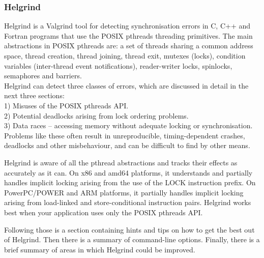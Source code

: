 \subsubsection{Helgrind}
Helgrind is a Valgrind tool for detecting synchronisation errors in C, C++ and Fortran programs that use the POSIX pthreads threading primitives.
The main abstractions in POSIX pthreads are: a set of threads sharing a common address space, thread creation, thread joining, thread exit, mutexes (locks), condition variables (inter-thread event notifications), reader-writer locks, spinlocks, semaphores and barriers.\\
Helgrind can detect three classes of errors, which are discussed in detail in the next three sections:\\
1) Misuses of the POSIX pthreads API.\\
2) Potential deadlocks arising from lock ordering problems.\\
3) Data races -- accessing memory without adequate locking or synchronisation. \\
Problems like these often result in unreproducible, timing-dependent crashes, deadlocks and other misbehaviour, and can be difficult to find by other means.

Helgrind is aware of all the pthread abstractions and tracks their effects as accurately as it can. On x86 and amd64 platforms, it understands and partially handles implicit locking arising from the use of the LOCK instruction prefix. On PowerPC/POWER and ARM platforms, it partially handles implicit locking arising from load-linked and store-conditional instruction pairs. Helgrind works best when your application uses only the POSIX pthreads API.

Following those is a section containing hints and tips on how to get the best out of Helgrind. Then there is a summary of command-line options. Finally, there is a brief summary of areas in which Helgrind could be improved. 

